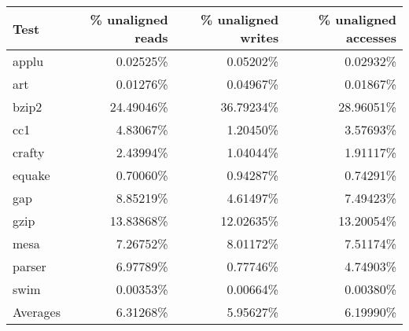 \begin{tabular}{lrrr}
\hline
Test & \% unaligned reads & \% unaligned writes & \% unaligned accesses \\
\hline
applu & 0.02525\% & 0.05202\% & 0.02932\%  \\
\hline
art & 0.01276\% & 0.04967\% & 0.01867\%  \\
\hline
bzip2 & 24.49046\% & 36.79234\% & 28.96051\%  \\
\hline
cc1 & 4.83067\% & 1.20450\% & 3.57693\%  \\
\hline
crafty & 2.43994\% & 1.04044\% & 1.91117\%  \\
\hline
equake & 0.70060\% & 0.94287\% & 0.74291\%  \\
\hline
gap & 8.85219\% & 4.61497\% & 7.49423\%  \\
\hline
gzip & 13.83868\% & 12.02635\% & 13.20054\%  \\
\hline
mesa & 7.26752\% & 8.01172\% & 7.51174\%  \\
\hline
parser & 6.97789\% & 0.77746\% & 4.74903\%  \\
\hline
swim & 0.00353\% & 0.00664\% & 0.00380\%  \\
\hline
{}Averages & 6.31268\% & 5.95627\% & 6.19990\%  \\
\hline
\end{tabular}
